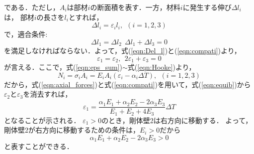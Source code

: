 ﻿\documentclass[10pt,a4j]{jarticle}
\begin{document}
である．ただし，$A_i$は部材$i$の断面積を表す．一方，材料$i$に発生する伸び$\Delta l_i$は，
部材$i$の長さを$l_i$とすれば，
\begin{equation}
	\Delta l_i = \varepsilon_i l_i, \ \ (i=1,2,3) 
	\label{eqn:Del_l}
\end{equation}
で，適合条件:
\begin{equation}
	\Delta l_1=\Delta l_2 \ \ \Delta l_1+\Delta l_3=0
	\label{eqn:compati}
\end{equation}
を満足しなければならない．よって，式(\ref{eqn:Del_l})と(\ref{eqn:compati})より，
\begin{equation}
	\varepsilon_1=\varepsilon_2, \ \ 2\varepsilon_1+\varepsilon_3=0
\end{equation}
が言える．ここで，式(\ref{eqn:eps_sum})$\sim$式(\ref{eqn:Hooke})より，
\begin{equation}
	N_i=\sigma_i A_i=E_iA_i\left( \varepsilon_i-\alpha_i \Delta T\right), \ \ (i=1,2,3)
	\label{eqn:axial_forces}
\end{equation}
だから，式(\ref{eqn:axial_forces})と式(\ref{eqn:compati})を用いて，式(\ref{eqn:equib})から
$\varepsilon_2$と$\varepsilon_3$を消去すれば，
\begin{equation}
	\varepsilon_1=\frac{\alpha_1E_1+\alpha_2E_2-2\alpha_3 E_3}{E_1+E_2+4E_3} \Delta T
\end{equation}
となることが示される．
$\varepsilon_1>0$のとき，剛体壁2は右方向に移動する．
よって，剛体壁2が右方向に移動するための条件は，$E_i>0$だから
\begin{equation}
	\alpha_1E_1+\alpha_2E_2-2\alpha_3 E_3 >0
\end{equation}
と表すことができる．
\end{document}

